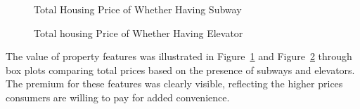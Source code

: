 \documentclass[
  letterpaper,
  DIV=11,
  numbers=noendperiod]{scrartcl}
\begin{document}
\begin{figure}


\caption{\label{fig-subway-distribution}Total Housing Price of Whether
Having Subway}

\end{figure}%

\begin{figure}


\caption{\label{fig-elevator-distribution}Total housing Price of Whether
Having Elevator}

\end{figure}%

The value of property features was illustrated in
Figure~\ref{fig-subway-distribution} and
Figure~\ref{fig-elevator-distribution} through box plots comparing total
prices based on the presence of subways and elevators. The premium for
these features was clearly visible, reflecting the higher prices
consumers are willing to pay for added convenience.
\end{document}
